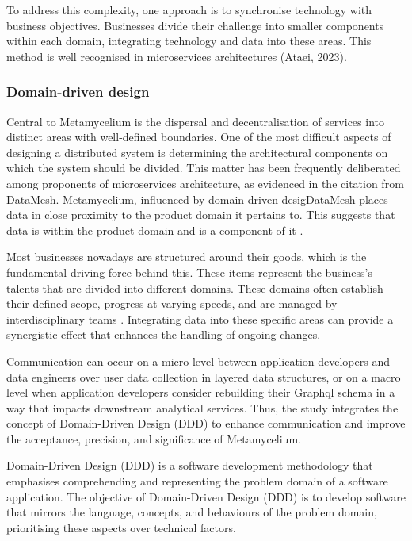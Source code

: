 \documentclass[journal]{IEEEtran}
\begin{document}
To address this complexity, one approach is to synchronise technology with business objectives. Businesses divide their challenge into smaller components within each domain, integrating technology and data into these areas. This method is well recognised in microservices architectures (Ataei, 2023). 

\subsubsection{Domain-driven design}


Central to Metamycelium is the dispersal and decentralisation of services into distinct areas with well-defined boundaries. One of the most difficult aspects of designing a distributed system is determining the architectural components on which the system should be divided. This matter has been frequently deliberated among proponents of microservices architecture, as evidenced in the citation from DataMesh. Metamycelium, influenced by domain-driven desigDataMesh places data in close proximity to the product domain it pertains to. This suggests that data is within the product domain and is a component of it \cite{laigner2021data}.

Most businesses nowadays are structured around their goods, which is the fundamental driving force behind this. These items represent the business's talents that are divided into different domains. These domains often establish their defined scope, progress at varying speeds, and are managed by interdisciplinary teams \cite{teamtopologiesSkelton}. Integrating data into these specific areas can provide a synergistic effect that enhances the handling of ongoing changes.

Communication can occur on a micro level between application developers and data engineers over user data collection in layered data structures, or on a macro level when application developers consider rebuilding their Graphql schema in a way that impacts downstream analytical services. Thus, the study integrates the concept of Domain-Driven Design (DDD) to enhance communication and improve the acceptance, precision, and significance of Metamycelium.

Domain-Driven Design (DDD) is a software development methodology that emphasises comprehending and representing the problem domain of a software application. The objective of Domain-Driven Design (DDD) is to develop software that mirrors the language, concepts, and behaviours of the problem domain, prioritising these aspects over technical factors. 
\end{document}
